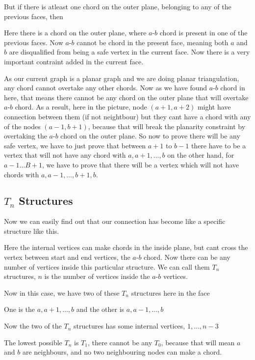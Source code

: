 \documentclass[12pt,a4paper]{article}
\begin{document}
But if there is atleast one chord on the outer plane, belonging to any of the previous faces, then

Here there is a chord on the outer plane, where $a$-$b$ chord is present in one of the previous faces. Now $a$-$b$ cannot be chord in the present face, meaning both $a$ and $b$ are disqualified from being a safe vertex in the current face. Now there is a very important contraint added in the current face.

As our current graph is a planar graph and we are doing planar triangulation, any chord cannot overtake any other chords. Now as we have found $a$-$b$ chord in here, that means there cannot be any chord on the outer plane that will overtake $a$-$b$ chord. As a result, here in the picture, node $(a+1, a+2)$ might have connection between them (if not neightbour) but they cant have a chord with any of the nodes $(a-1, b+1)$, because that will break the planarity constraint by overtaking the $a$-$b$ chord on the outer plane. So now to prove there will be any safe vertex, we have to just prove that between $a+1$ to $b-1$ there have to be a vertex that will not have any chord with $a , a+ 1, \ldots ,b$ on the other hand, for $a-1 \ldots B+1$, we have to prove that there will be a vertex which will not have chords with $a,a-1,\ldots,b+1,b$.

\subsection{$T_n$ Structures}

Now we can easily find out that our connection has become like a specific structure like this.

Here the internal vertices can make chords in the inside plane, but cant cross the vertex between start and end vertices, the $a$-$b$ chord. Now there can be any number of vertices inside this particular structure. We can call them $T_n$ structures, $n$ is the number of vertices inside the $a$-$b$ vertices. 

Now in this case, we have two of these $T_n$ structures here in the face

One is the $a,a+1,\ldots,b$ and the other is $a,a-1,\ldots,b$ 

Now the two of the $T_n$ structures has some internal vertices, $1,\ldots,n-3$

The lowest possible $T_n$ is $T_1$, there cannot be any $T_0$, because that will mean $a$ and $b$ are neighbours, and no two neighbouring nodes can make a chord.
\end{document}
